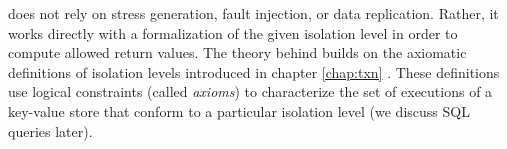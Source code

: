 \tool{} does not rely on stress generation, fault
injection, or data replication. 
Rather, it works directly with a formalization of
the given isolation level in order to compute allowed return values.
The theory behind \tool{} builds on the axiomatic definitions of isolation
levels introduced in chapter \ref{chap:txn} \cite{DBLP:journals/pacmpl/BiswasE19}. These
definitions use logical constraints (called \emph{axioms}) to characterize the
set of executions of a key-value store that conform to a particular isolation
level (we discuss SQL queries later).


